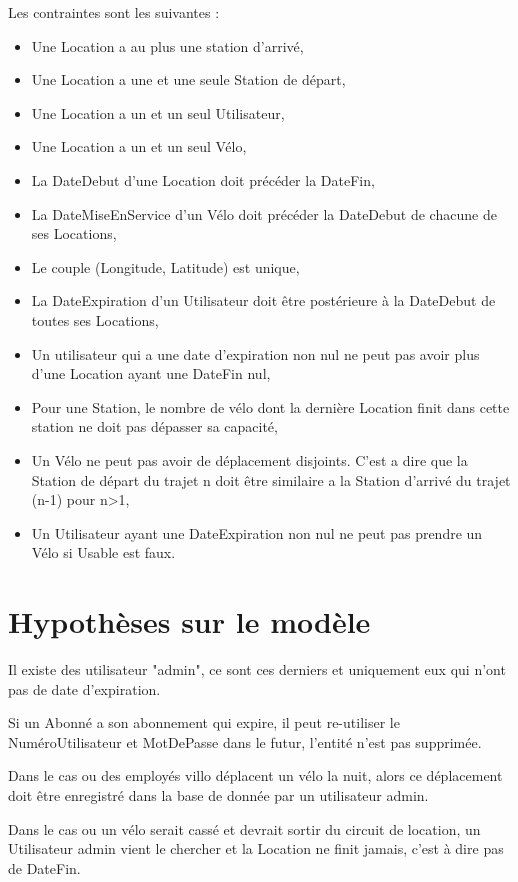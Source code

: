 \documentclass[a4paper,10pt]{article}
\begin{document}
Les contraintes sont les suivantes :
\begin{itemize}
  \item Une Location a au plus une station d'arrivé,
  \item Une Location a une et une seule Station de départ,
  \item Une Location a un et un seul Utilisateur,
  \item Une Location a un et un seul Vélo,
  \item La DateDebut d'une Location doit précéder la DateFin, 
  \item La DateMiseEnService d'un Vélo doit précéder la DateDebut de chacune de ses Locations,
  \item Le couple (Longitude, Latitude) est unique,
  \item La DateExpiration d'un Utilisateur doit \^etre postérieure à la DateDebut de toutes ses Locations,
  \item Un utilisateur qui a une date d'expiration non nul ne peut pas avoir plus d'une Location ayant une DateFin nul,
  \item Pour une Station, le nombre de vélo dont la dernière Location finit  dans cette station ne doit pas dépasser sa capacité,
  \item Un Vélo ne peut pas avoir de déplacement disjoints. C'est a dire que la Station de départ du trajet n doit \^etre similaire a la Station d'arrivé du trajet (n-1) pour n>1,
  \item Un Utilisateur ayant une DateExpiration non nul ne peut pas prendre un Vélo si Usable est faux.
\end{itemize}

\section{Hypothèses sur le modèle}

Il existe des utilisateur "admin", ce sont ces derniers et uniquement eux qui n'ont pas de date d'expiration.

Si un Abonné a son abonnement qui expire, il peut re-utiliser le NuméroUtilisateur et MotDePasse dans le futur, l'entité n'est pas supprimée.

Dans le cas ou des employés villo déplacent un vélo la nuit, alors ce déplacement doit être enregistré dans la base de donnée par un utilisateur admin.

Dans le cas ou un vélo serait cassé et devrait sortir du circuit de location, un Utilisateur admin vient le chercher et la Location ne finit jamais, c'est à dire pas de DateFin.
\end{document}
